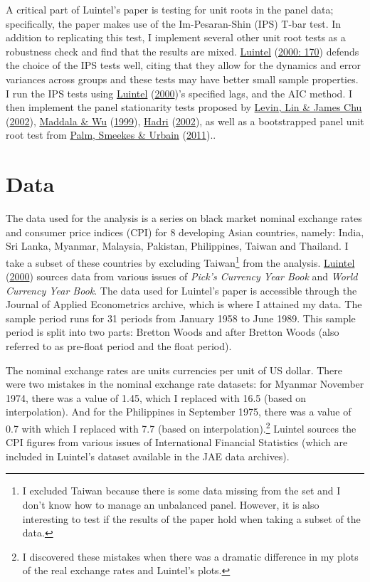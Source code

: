 \documentclass[11pt,preprint, authoryear]{elsarticle}
\numberwithin{equation}{section}
\numberwithin{figure}{section}
\numberwithin{table}{section}
\let\rmarkdownfootnote\footnote%
\def\footnote{\protect\rmarkdownfootnote}
\begin{document}
A critical part of Luintel's paper is testing for unit roots in the
panel data; specifically, the paper makes use of the Im-Pesaran-Shin
(IPS) T-bar test. In addition to replicating this test, I implement
several other unit root tests as a robustness check and find that the
results are mixed. \protect\hyperlink{ref-Kul}{Luintel}
(\protect\hyperlink{ref-Kul}{2000: 170}) defends the choice of the IPS
tests well, citing that they allow for the dynamics and error variances
across groups and these tests may have better small sample properties. I
run the IPS tests using \protect\hyperlink{ref-Kul}{Luintel}
(\protect\hyperlink{ref-Kul}{2000})'s specified lags, and the AIC
method. I then implement the panel stationarity tests proposed by
\protect\hyperlink{ref-lev}{Levin, Lin \& James Chu}
(\protect\hyperlink{ref-lev}{2002}), \protect\hyperlink{ref-wu}{Maddala
\& Wu} (\protect\hyperlink{ref-wu}{1999}),
\protect\hyperlink{ref-had}{Hadri} (\protect\hyperlink{ref-had}{2002}),
as well as a bootstrapped panel unit root test from
\protect\hyperlink{ref-pal}{Palm, Smeekes \& Urbain}
(\protect\hyperlink{ref-pal}{2011})..

\hypertarget{data}{%
\section{\texorpdfstring{Data \label{Data}}{Data }}\label{data}}

The data used for the analysis is a series on black market nominal
exchange rates and consumer price indices (CPI) for 8 developing Asian
countries, namely: India, Sri Lanka, Myanmar, Malaysia, Pakistan,
Philippines, Taiwan and Thailand. I take a subset of these countries by
excluding Taiwan\footnote{I excluded Taiwan because there is some data
  missing from the set and I don't know how to manage an unbalanced
  panel. However, it is also interesting to test if the results of the
  paper hold when taking a subset of the data.} from the analysis.
\protect\hyperlink{ref-Kul}{Luintel} (\protect\hyperlink{ref-Kul}{2000})
sources data from various issues of \emph{Pick's Currency Year Book} and
\emph{World Currency Year Book}. The data used for Luintel's paper is
accessible through the Journal of Applied Econometrics archive, which is
where I attained my data. The sample period runs for 31 periods from
January 1958 to June 1989. This sample period is split into two parts:
Bretton Woods and after Bretton Woods (also referred to as pre-float
period and the float period).

The nominal exchange rates are units currencies per unit of US dollar.
There were two mistakes in the nominal exchange rate datasets: for
Myanmar November 1974, there was a value of 1.45, which I replaced with
16.5 (based on interpolation). And for the Philippines in September
1975, there was a value of 0.7 with which I replaced with 7.7 (based on
interpolation).\footnote{I discovered these mistakes when there was a
  dramatic difference in my plots of the real exchange rates and
  Luintel's plots.} Luintel sources the CPI figures from various issues
of International Financial Statistics (which are included in Luintel's
dataset available in the JAE data archives).
\end{document}
